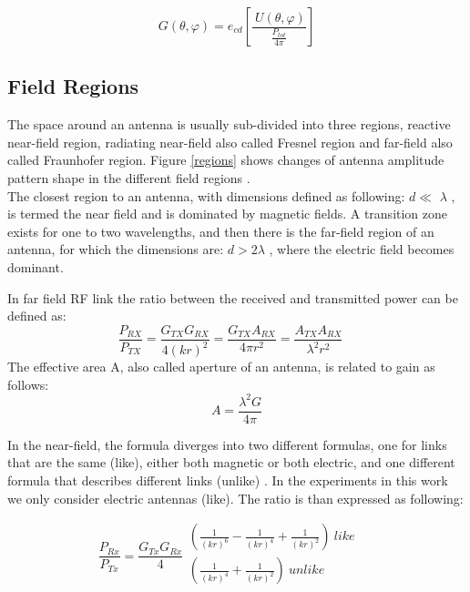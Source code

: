 \begin{equation}
G \left(  \theta , \varphi  \right) =e_{cd} \left[ \frac{~U \left(  \theta , \varphi  \right) }{\frac{P_{tot}}{4 \pi }} \right]
\end{equation}



\subsection{Field Regions}
The space around an antenna is usually sub-divided into three regions, reactive near-field region, radiating near-field also called Fresnel region and far-field also called Fraunhofer region. Figure \ref{regions} shows changes of antenna amplitude pattern shape in the different field regions \cite{schantz}. \\

The closest region to an antenna, with dimensions defined as following: $d \ll $ $ \lambda $  , is termed the near field and is dominated by magnetic fields. A transition zone exists for one to two wavelengths, and then there is the far-field region of an antenna, for which the dimensions are: $d>2\lambda $  , where the electric field becomes dominant.

In far field \acs{RF} link the ratio between the received and transmitted power can be defined as:
\begin{equation}
\frac{P_{RX}}{P_{TX}}=\frac{G_{TX}G_{RX}}{4 \left( kr \right) ^{2}}=\frac{G_{TX}A_{RX}}{4 \pi r^{2}}=\frac{A_{TX}A_{RX}}{ \lambda ^{2}r^{2}} \quad %
\end{equation}
The effective area A, also called aperture of an antenna, is related to gain as follows: 
\begin{equation}
A=\frac{ \lambda ^{2}G}{4 \pi }
\end{equation}

In the near-field, the formula diverges into two different formulas, one for links that are the same (like), either both magnetic or both electric, and one different formula that describes different links (unlike) \cite{schantz}. In the experiments in this work we only consider electric antennas (like). The ratio is than expressed as following:

\begin{equation} \label{eq:near}
\frac{P_{Rx}}{P_{Tx}}=\frac{G_{Tx}G_{Rx}}{4} \begin{array}{c}
	 \left( \frac{1}{ \left( kr \right) ^{6}}-\frac{1}{ \left( kr \right) ^{4}}+\frac{1}{ \left( kr \right) ^{2}} \right) ~like~\\
	 \left( \frac{1}{ \left( kr \right) ^{4}}+\frac{1}{ \left( kr \right) ^{2}} \right) ~unlike\\
	\end{array} \quad %
\end{equation}

